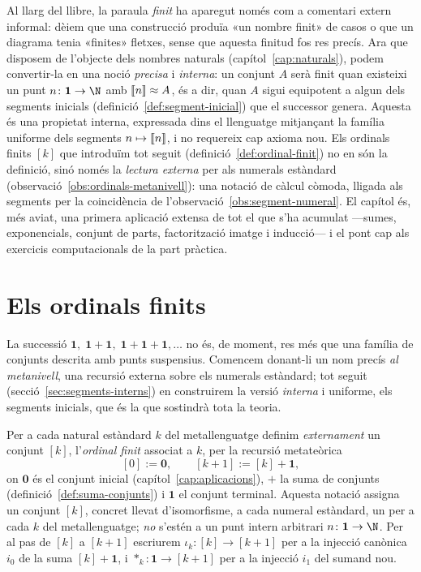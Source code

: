 Al llarg del llibre, la paraula \emph{finit} ha aparegut només com a
comentari extern informal: dèiem que una construcció produïa «un nombre
finit» de casos o que un diagrama tenia «finites» fletxes, sense que
aquesta finitud fos res precís. Ara que disposem de l'objecte dels nombres
naturals (capítol~\ref{cap:naturals}), podem convertir-la en una noció
\emph{precisa} i \emph{interna}: un conjunt \(A\) serà finit quan existeixi
un punt \(n\colon\mathbf1\to\N\) amb \(\llbracket n\rrbracket\approx A\), és a dir, quan
\(A\) sigui equipotent a algun dels segments inicials
(definició~\ref{def:segment-inicial}) que el successor genera. Aquesta és
una propietat interna, expressada dins el llenguatge mitjançant la família
uniforme dels segments \(n\mapsto\llbracket n\rrbracket\), i no requereix cap axioma nou.
Els ordinals finits \([k]\) que introduïm tot seguit
(definició~\ref{def:ordinal-finit}) no en són la definició, sinó només la
\emph{lectura externa} per als numerals estàndard
(observació~\ref{obs:ordinals-metanivell}): una notació de càlcul còmoda,
lligada als segments per la coincidència de
l'observació~\ref{obs:segment-numeral}. El capítol és, més aviat, una
primera aplicació extensa de tot el que s'ha acumulat ---sumes,
exponencials, conjunt de parts, factorització imatge i inducció--- i el
pont cap als exercicis computacionals de la part pràctica.

\section{Els ordinals finits}\label{sec:ordinals-finits}

La successió \(\mathbf1,\;\mathbf1+\mathbf1,\;\mathbf1+\mathbf1+\mathbf1,
\dots\) no és, de moment, res més que una família de conjunts descrita amb
punts suspensius. Comencem donant-li un nom precís \emph{al metanivell},
una recursió externa sobre els numerals estàndard; tot seguit
(secció~\ref{sec:segments-interns}) en construirem la versió \emph{interna}
i uniforme, els segments inicials, que és la que sostindrà tota la teoria.

\begin{definicio}\label{def:ordinal-finit}
Per a cada natural estàndard \(k\) del metallenguatge definim
\emph{externament} un conjunt \([k]\), l'\emph{ordinal finit}
associat a \(k\), per la recursió metateòrica
\[
[0]:=\mathbf0,
\qquad
[k+1]:=[k]+\mathbf1,
\]
on \(\mathbf0\) és el conjunt inicial (capítol~\ref{cap:aplicacions}),
\(+\) la suma de conjunts (definició~\ref{def:suma-conjunts}) i
\(\mathbf1\) el conjunt terminal. Aquesta notació assigna un conjunt
\([k]\), concret llevat d'isomorfisme, a cada numeral estàndard, un per a
cada \(k\) del metallenguatge; \emph{no} s'estén a un punt intern arbitrari
\(n\colon\mathbf1\to\N\). Per al pas de \([k]\) a \([k+1]\) escriurem
\(\iota_k\colon[k]\to[k+1]\) per a la injecció canònica \(i_0\) de la suma
\([k]+\mathbf1\), i \(\ast_k\colon\mathbf1\to[k+1]\) per a la injecció
\(i_1\) del sumand nou.
\end{definicio}

